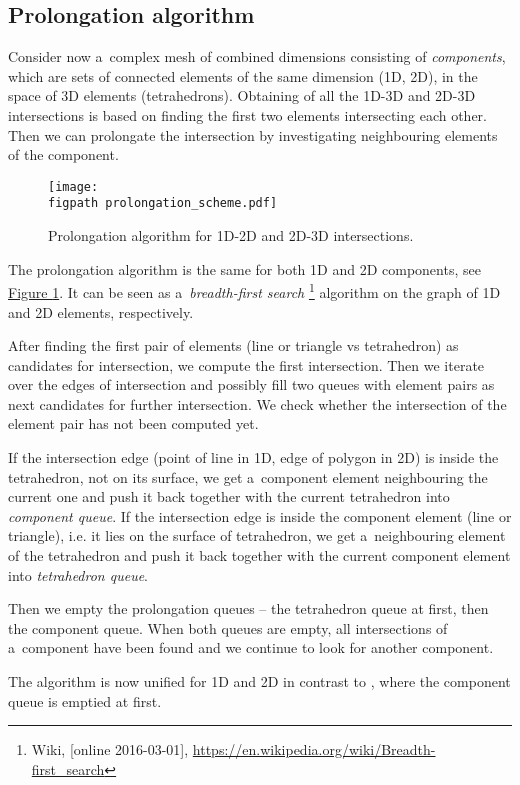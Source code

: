 \documentclass[dvipsnames,FM,Dis]{tulthesis}
\newcommand{\fig}[1]{\hyperref[#1]{Figure \ref{#1}}}
\newcommand{\figpath}{figures/}
\begin{document}
\subsection{Prolongation algorithm}
Consider now a~complex mesh of combined dimensions consisting of \emph{components}, which are sets of connected
elements of the same dimension (1D, 2D), in the space of 3D elements (tetrahedrons). 
Obtaining of all the 1D-3D and 2D-3D intersections is based on finding the first two elements intersecting each other.
Then we can prolongate the intersection by investigating neighbouring elements of the component.
%
\begin{figure}[!htb]
  \centering    
    \texttt{[image: \\figpath prolongation\_scheme.pdf]}
  \caption{Prolongation algorithm for 1D-2D and 2D-3D intersections. }
  \label{fig:prolongation}
\end{figure}

The prolongation algorithm is the same for both 1D and 2D components, see \fig{fig:prolongation}. 
It can be seen as a~\emph{breadth-first search}
\footnote{Wiki, [online 2016-03-01], \url{https://en.wikipedia.org/wiki/Breadth-first_search}}
algorithm on the graph of 1D and 2D elements, respectively.

After finding the first pair of elements (line or triangle vs tetrahedron) as candidates for intersection, 
we compute the first intersection. Then we iterate over the edges of intersection and possibly fill two queues 
with element pairs as next candidates for further intersection. We check whether the intersection of the element pair
has not been computed yet.

If the intersection edge (point of line in 1D, edge of polygon in 2D) is inside the tetrahedron, not on its surface, we
get a~component element neighbouring the current one and push it back together with the current tetrahedron into 
\emph{component queue}. If the intersection edge is inside the component element 
(line or triangle), i.e. it lies on the surface of tetrahedron, we get a~neighbouring element of the tetrahedron
and push it back together with the current component element into \emph{tetrahedron queue}.

Then we empty the prolongation queues -- the tetrahedron queue at first, then the component queue.
When both queues are empty, all intersections of a~component have been found and we continue to look for
another component.

The algorithm is now unified for 1D and 2D in contrast to \cite{fris_dp_2015}, where the component
queue is emptied at first.
\end{document}
